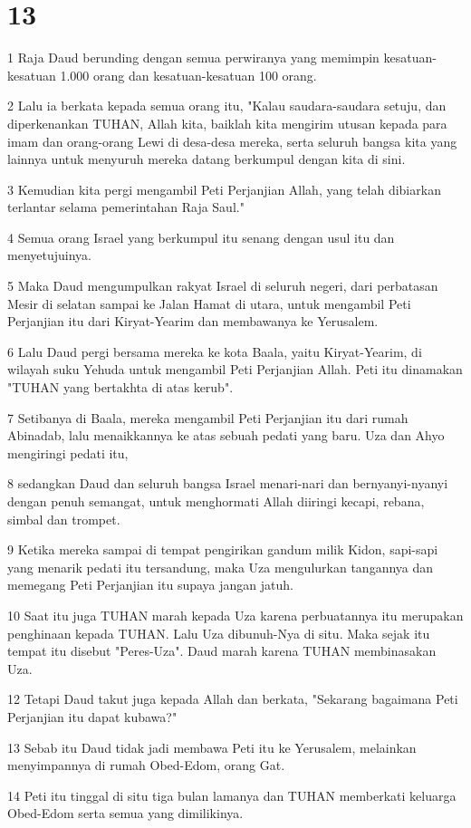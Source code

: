 \chapter{13}

\par 1 Raja Daud berunding dengan semua perwiranya yang memimpin kesatuan-kesatuan 1.000 orang dan kesatuan-kesatuan 100 orang.
\par 2 Lalu ia berkata kepada semua orang itu, "Kalau saudara-saudara setuju, dan diperkenankan TUHAN, Allah kita, baiklah kita mengirim utusan kepada para imam dan orang-orang Lewi di desa-desa mereka, serta seluruh bangsa kita yang lainnya untuk menyuruh mereka datang berkumpul dengan kita di sini.
\par 3 Kemudian kita pergi mengambil Peti Perjanjian Allah, yang telah dibiarkan terlantar selama pemerintahan Raja Saul."
\par 4 Semua orang Israel yang berkumpul itu senang dengan usul itu dan menyetujuinya.
\par 5 Maka Daud mengumpulkan rakyat Israel di seluruh negeri, dari perbatasan Mesir di selatan sampai ke Jalan Hamat di utara, untuk mengambil Peti Perjanjian itu dari Kiryat-Yearim dan membawanya ke Yerusalem.
\par 6 Lalu Daud pergi bersama mereka ke kota Baala, yaitu Kiryat-Yearim, di wilayah suku Yehuda untuk mengambil Peti Perjanjian Allah. Peti itu dinamakan "TUHAN yang bertakhta di atas kerub".
\par 7 Setibanya di Baala, mereka mengambil Peti Perjanjian itu dari rumah Abinadab, lalu menaikkannya ke atas sebuah pedati yang baru. Uza dan Ahyo mengiringi pedati itu,
\par 8 sedangkan Daud dan seluruh bangsa Israel menari-nari dan bernyanyi-nyanyi dengan penuh semangat, untuk menghormati Allah diiringi kecapi, rebana, simbal dan trompet.
\par 9 Ketika mereka sampai di tempat pengirikan gandum milik Kidon, sapi-sapi yang menarik pedati itu tersandung, maka Uza mengulurkan tangannya dan memegang Peti Perjanjian itu supaya jangan jatuh.
\par 10 Saat itu juga TUHAN marah kepada Uza karena perbuatannya itu merupakan penghinaan kepada TUHAN. Lalu Uza dibunuh-Nya di situ. Maka sejak itu tempat itu disebut "Peres-Uza". Daud marah karena TUHAN membinasakan Uza.
\par 12 Tetapi Daud takut juga kepada Allah dan berkata, "Sekarang bagaimana Peti Perjanjian itu dapat kubawa?"
\par 13 Sebab itu Daud tidak jadi membawa Peti itu ke Yerusalem, melainkan menyimpannya di rumah Obed-Edom, orang Gat.
\par 14 Peti itu tinggal di situ tiga bulan lamanya dan TUHAN memberkati keluarga Obed-Edom serta semua yang dimilikinya.

